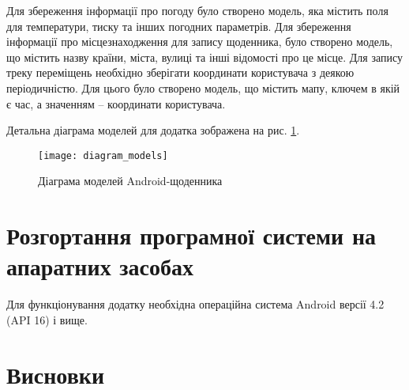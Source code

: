 \documentclass[../main.tex]{subfiles}
\begin{document}
Для збереження інформації про погоду було створено модель, яка містить поля для температури, тиску та інших погодних параметрів. Для збереження інформації про місцезнаходження для запису щоденника, було створено модель, що містить назву країни, міста, вулиці та інші відомості про це місце. Для запису треку переміщень необхідно зберігати координати користувача з деякою періодичністю. Для цього було створено модель, що містить мапу, ключем в якій є час, а значенням -- координати користувача.

Детальна діаграма моделей для додатка зображена на рис. \ref{diagram:models}.

\begin{figure}[H]
	\centering
	\texttt{[image: diagram\_models]}
	\caption{Діаграма моделей Android-щоденника}
	\label{diagram:models}
\end{figure}



\section{Розгортання програмної системи на апаратних засобах}

Для функціонування додатку необхідна операційна система Android версії 4.2 (API 16) і вище.


\section{Висновки}

\end{document}
